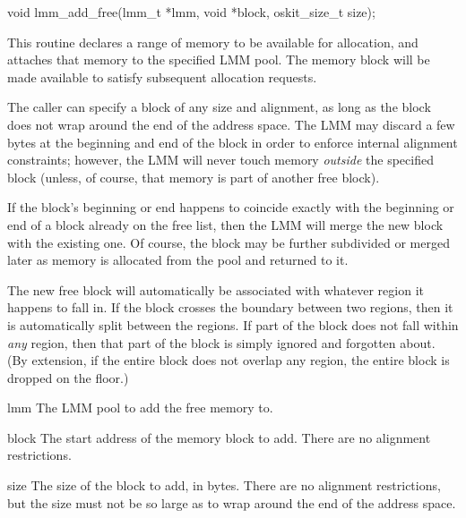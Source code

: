 \label{lmm-add-free}
\begin{apisyn}

	\funcproto void lmm_add_free(lmm_t *lmm, void *block, oskit_size_t size);
\end{apisyn}
\begin{apidesc}
	This routine declares a range of memory to be available for allocation,
	and attaches that memory to the specified LMM pool.
	The memory block will be made available
	to satisfy subsequent allocation requests.

	The caller can specify a block of any size and alignment,
	as long as the block does not wrap around the end of the address space.
	The LMM may discard a few bytes at the beginning and end of the block
	in order to enforce internal alignment constraints; however,
	the LMM will never touch memory \emph{outside} the specified block
	(unless, of course, that memory is part of another free block).

	If the block's beginning or end happens to coincide exactly
	with the beginning or end of a block already on the free list,
	then the LMM will merge the new block with the existing one.
	Of course, the block may be further subdivided or merged later
	as memory is allocated from the pool and returned to it.

	The new free block will automatically be associated
	with whatever region it happens to fall in.
	If the block crosses the boundary between two regions,
	then it is automatically split between the regions.
	If part of the block does not fall within \emph{any} region,
	then that part of the block is simply ignored and forgotten about.
	(By extension, if the entire block does not overlap any region,
	the entire block is dropped on the floor.)
\end{apidesc}
\begin{apiparm}
	\item[lmm]
		The LMM pool to add the free memory to.
	\item[block]
		The start address of the memory block to add.
		There are no alignment restrictions.
	\item[size]
		The size of the block to add, in bytes.
		There are no alignment restrictions,
		but the size must not be so large
		as to wrap around the end of the address space.
\end{apiparm}

